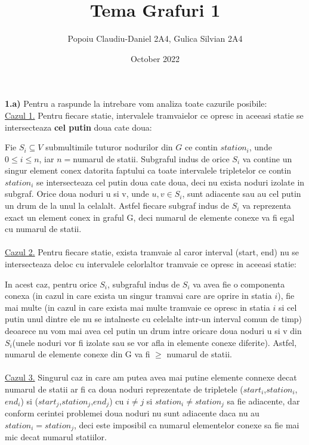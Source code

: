 \documentclass{article}
\title{Tema Grafuri 1}
\author{Popoiu Claudiu-Daniel 2A4, Gulica Silvian 2A4}
\date{October 2022}
\begin{document}
\maketitle

\textbf{1.a)} Pentru a raspunde la intrebare vom analiza toate cazurile posibile:
 \\  \underline{Cazul 1.} Pentru fiecare statie, intervalele tramvaielor ce opresc in aceeasi statie se intersecteaza \textbf{cel putin}  doua cate doua:
\par Fie $S_{i}\subseteq V$ submultimile tuturor nodurilor din $G$ ce contin $station_{i}$, unde $0\leq i \leq n$, iar $n=$numarul de statii. 
 Subgraful indus de orice $S_{i}$ va contine un singur element conex datorita faptului ca toate intervalele tripletelor ce contin $station_{i}$ se intersecteaza cel putin doua cate doua, deci nu exista noduri izolate in subgraf. Orice doua noduri u si v, unde $u,v\in S_{i}$, sunt adiacente sau au cel putin un drum de la unul la celalalt. Astfel fiecare subgraf indus de $S_{i}$ va reprezenta exact un element conex in graful G, deci numarul de elemente conexe va fi egal cu numarul de statii.
\\ \\ \underline{Cazul 2.} Pentru fiecare statie, exista tramvaie al caror interval (start, end) nu se intersecteaza deloc cu intervalele celorlaltor tramvaie ce opresc in aceeasi statie:
   \par In acest caz, pentru orice $S_{i}$, subgraful indus de $S_{i}$ va avea fie o componenta conexa (in cazul in care exista un singur tramvai care are oprire in statia $i$), fie mai multe (in cazul in care exista mai multe tramvaie ce opresc in statia $i$ si cel putin unul dintre ele nu se intalneste cu celelalte intr-un interval comun de timp) deoarece nu vom mai avea cel putin un drum intre oricare doua noduri u si v din $S_{i}$(unele noduri vor fi izolate sau se vor afla in elemente conexe diferite). Astfel, numarul de elemente conexe din G va fi $\geq$ numarul de statii.
\\ \\ \underline{Cazul 3.} Singurul caz in care am putea avea mai putine elemente connexe decat numarul de statii ar fi ca doua noduri reprezentate de tripletele ($start_{i}$,$station_{i}$,$end_{i}$) si ($start_{j}$,$station_{j}$,$end_{j}$) cu $i\neq j$ si $station_{i}\neq station_{j}$ sa fie adiacente, dar conform cerintei problemei doua noduri nu sunt adiacente daca nu au $station_{i}=station_{j}$, deci este imposibil ca numarul elementelor conexe sa fie mai mic decat numarul statiilor. 
\end{document}
